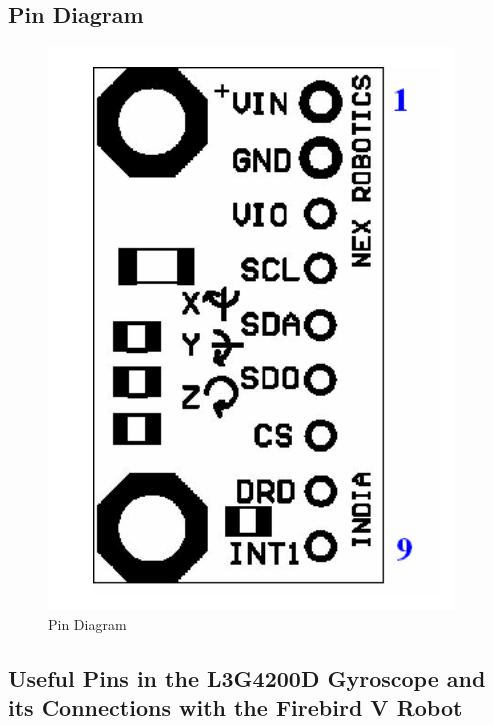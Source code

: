 \documentclass[a4paper,12 pt]{article}
\begin{document}
\subsection{Pin Diagram}
\begin{figure}[!h]
\begin{center}
 \includegraphics[scale=0.8]{gyr3.png}
\end{center}
\caption{Pin Diagram}
\label{fig:1}
\end{figure}
\newpage
\subsection{Useful Pins in the L3G4200D Gyroscope and its Connections with the Firebird V Robot}
\end{document}
